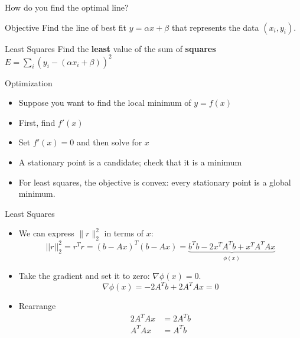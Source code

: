 \documentclass[10pt]{beamer}
\begin{document}
\begin{frame}{How do you find the optimal line?}

\begin{block}{Objective}
    Find the line of best fit $y=\alpha x+\beta$ that represents the data $(x_i,y_i)$.
\end{block}
\vfill 
\begin{block}{Least Squares}
    Find the \textbf{least} value of the sum of \textbf{squares} $E = \sum_i(y_i - (\alpha x_i+\beta))^2$
\end{block}
\vfill 

\vfill 

\end{frame}


\begin{frame}{Optimization}

\begin{itemize}
    \item Suppose you want to find the local minimum of $y=f(x)$
        \vfill

    \item First, find $f'(x)$
        \vfill

    \item Set $f'(x)=0$ and then solve for $x$
        \vfill

    \item A stationary point is a candidate; check that it is a minimum
        \vfill
    \item<2> For least squares, the objective is convex: every stationary point is a global minimum.
\end{itemize}
    
\end{frame}


\begin{frame}{Least Squares}
\begin{itemize}
 
    \item We can express $\| r\|_2^2$ in terms of $x$:
    $$||r||^2_2 = r^Tr = (b-Ax)^T(b-Ax) = \underbrace{b^Tb - 2x^TA^Tb + x^TA^TAx}_{\phi(x)}$$

\item Take the gradient and set it to zero: $\nabla\phi(x)=0$.  
 $$\nabla\phi(x) = -2A^Tb+  2A^TAx = 0$$

\item Rearrange 
\begin{align*}
       2A^TAx &= 2A^Tb\\
       A^TAx &= A^Tb
\end{align*}


\end{itemize}
\end{frame}
\end{document}
